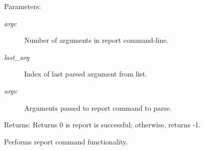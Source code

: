 \begin{Desc}
\item[Parameters:]
\begin{description}
\item[{\em argc}]Number of arguments in report command-line. \item[{\em last\_\-arg}]Index of last parsed argument from list. \item[{\em argv}]Arguments passed to report command to parse.\end{description}
\end{Desc}
\begin{Desc}
\item[Returns:]Returns 0 is report is successful; otherwise, returns -1.\end{Desc}
Performs report command functionality. 